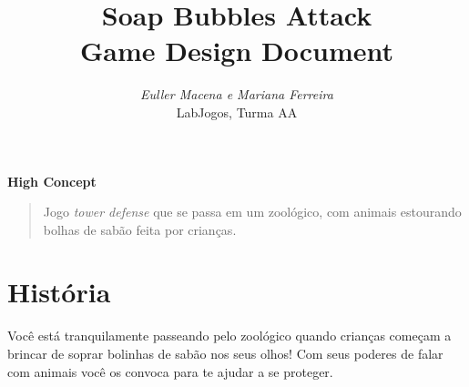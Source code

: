 \documentclass[a4paper,draft,12pt]{article}
\begin{document}
\thispagestyle{empty}
\baselineskip 7.5mm %

\title{\bf Soap Bubbles Attack \\ \vspace{3mm}\large Game Design Document}
\author{\emph{Euller Macena e Mariana Ferreira}\\ \small LabJogos, Turma AA}
\date{ }

\maketitle

%

\vfill

\bigskip
\bigskip

\begin{center}
{\bf\large High Concept}
\bigskip

{\parbox{13cm}{\begin{quotation}\large Jogo \emph{tower defense} que se passa em um zoológico, com animais estourando bolhas de sabão feita por crianças.\end{quotation}}}
\end{center}

\bigskip
\bigskip

\vfill

\section{História}

Você está tranquilamente passeando pelo zoológico quando crianças começam a brincar de soprar bolinhas de sabão nos seus olhos! Com seus poderes de falar com animais você os convoca para te ajudar a se proteger.
\end{document}
